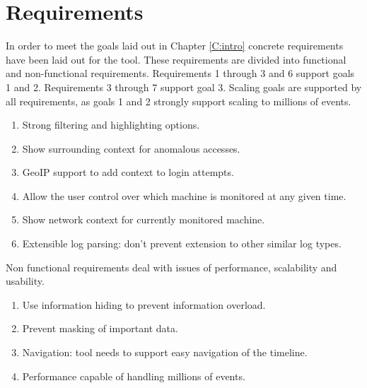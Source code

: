 \section{Requirements}\label{reqs}

In order to meet the goals laid out in Chapter \ref{C:intro} concrete requirements have been laid out for the tool.
These requirements are divided into functional and non-functional requirements. Requirements 1 through 3 and 6 support goals 1 and 2. Requirements 3 through 7 support goal 3. Scaling goals are supported by all requirements, as goals 1 and 2 strongly support scaling to millions of events.  

\begin{enumerate}
\item{Strong filtering and highlighting options.}
\item{Show surrounding context for anomalous accesses.}
\item{GeoIP support to add context to login attempts.}
\item{Allow the user control over which machine is monitored at any given time.}
\item{Show network context for currently monitored machine.}
\item{Extensible log parsing: don't prevent extension to other similar log types.}
\end{enumerate}

Non functional requirements deal with issues of performance, scalability and usability.
\begin{enumerate}
\item{Use information hiding to prevent information overload.}
\item{Prevent masking of important data.}
\item{Navigation: tool needs to support easy navigation of the timeline.}
\item{Performance capable of handling millions of events.}
\end{enumerate}